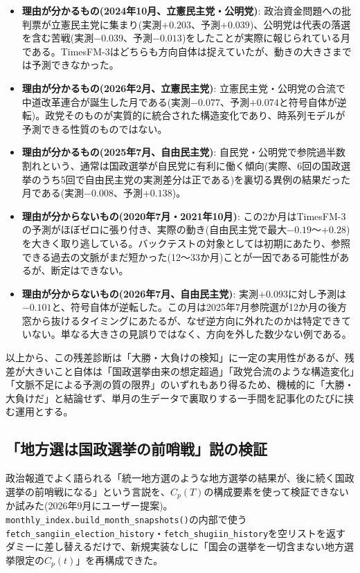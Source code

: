 \documentclass[a4paper,11pt]{ltjsarticle}
\begin{document}
\begin{itemize}
  \item \textbf{理由が分かるもの(2024年10月、立憲民主党・公明党)}: 政治資金問題への批判票が立憲民主党に集まり(実測$+0.203$、予測$+0.039$)、公明党は代表の落選を含む苦戦(実測$-0.039$、予測$-0.013$)をしたことが実際に報じられている月である。TimesFM-3はどちらも方向自体は捉えていたが、動きの大きさまでは予測できなかった。
  \item \textbf{理由が分かるもの(2026年2月、立憲民主党)}: 立憲民主党・公明党の合流で中道改革連合が誕生した月である(実測$-0.077$、予測$+0.074$と符号自体が逆転)。政党そのものが実質的に統合された構造変化であり、時系列モデルが予測できる性質のものではない。
  \item \textbf{理由が分かるもの(2025年7月、自由民主党)}: 自民党・公明党で参院過半数割れという、通常は国政選挙が自民党に有利に働く傾向(実際、6回の国政選挙のうち5回で自由民主党の実測差分は正である)を裏切る異例の結果だった月である(実測$-0.008$、予測$+0.138$)。
  \item \textbf{理由が分からないもの(2020年7月・2021年10月)}: この2か月はTimesFM-3の予測がほぼゼロに張り付き、実際の動き(自由民主党で最大$-0.19$〜$+0.28$)を大きく取り逃している。バックテストの対象としては初期にあたり、参照できる過去の文脈がまだ短かった(12〜33か月)ことが一因である可能性があるが、断定はできない。
  \item \textbf{理由が分からないもの(2026年7月、自由民主党)}: 実測$+0.093$に対し予測は$-0.101$と、符号自体が逆転した。この月は2025年7月参院選が12か月の後方窓から抜けるタイミングにあたるが、なぜ逆方向に外れたのかは特定できていない。単なる大きさの見誤りではなく、方向を外した数少ない例である。
\end{itemize}

以上から、この残差診断は「大勝・大負けの検知」に一定の実用性があるが、残差が大きいこと自体は「国政選挙由来の想定超過」「政党合流のような構造変化」「文脈不足による予測の質の限界」のいずれもあり得るため、機械的に「大勝・大負けだ」と結論せず、単月の生データで裏取りする一手間を記事化のたびに挟む運用とする。

\subsection{「地方選は国政選挙の前哨戦」説の検証}
\label{sec:local-national-precursor}

政治報道でよく語られる「統一地方選のような地方選挙の結果が、後に続く国政選挙の前哨戦になる」という言説を、$C_p(T)$の構成要素を使って検証できないか試みた(2026年9月にユーザー提案)。\texttt{monthly\_index.build\_month\_snapshots()}の内部で使う\texttt{fetch\_sangiin\_election\_history}・\texttt{fetch\_shugiin\_history}を空リストを返すダミーに差し替えるだけで、新規実装なしに「国会の選挙を一切含まない地方選挙限定の$C_p(t)$」を再構成できた。
\end{document}
